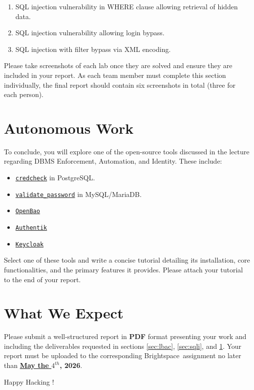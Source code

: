 \documentclass{article}
\begin{document}
\begin{enumerate}
    \item SQL injection vulnerability in WHERE clause allowing retrieval of hidden data.
    \item SQL injection vulnerability allowing login bypass.
    \item SQL injection with filter bypass via XML encoding.
\end{enumerate}

Please take screenshots of each lab once they are solved and ensure they are included in your report. As each team member must complete this section individually, the final report should contain six screenshots in total (three for each person).

\section{Autonomous Work} \label{sec:work}
To conclude, you will explore one of the open-source tools discussed in the lecture regarding DBMS Enforcement, Automation, and Identity. These include:

\begin{itemize}
    \item \texttt{\href{https://github.com/HexaCluster/credcheck}{credcheck}} in PostgreSQL.
    \item \texttt{\href{https://dev.mysql.com/doc/refman/8.4/en/validate-password-options-variables.html}{validate\_password}} in MySQL/MariaDB.
    \item \texttt{\href{https://openbao.org/}{OpenBao}}
    \item \texttt{\href{https://goauthentik.io/}{Authentik}}
    \item \texttt{\href{https://www.keycloak.org/}{Keycloak}}
\end{itemize}

Select one of these tools and write a concise tutorial detailing its installation, core functionalities, and the primary features it provides. Please attach your tutorial to the end of your report.

\section{What We Expect}
Please submit a well-structured report in \textbf{PDF} format presenting your work and including the deliverables requested in sections \ref{sec:lbac}, \ref{sec:sqli}, and \ref{sec:work}. Your report must be uploaded to the corresponding Brightspace\texttrademark ~assignment no later than \textbf{\href{https://www.starwars.com/star-wars-day}{May the $4^{th}$}, 2026}.

\vspace{5mm}
Happy Hacking !
\end{document}
